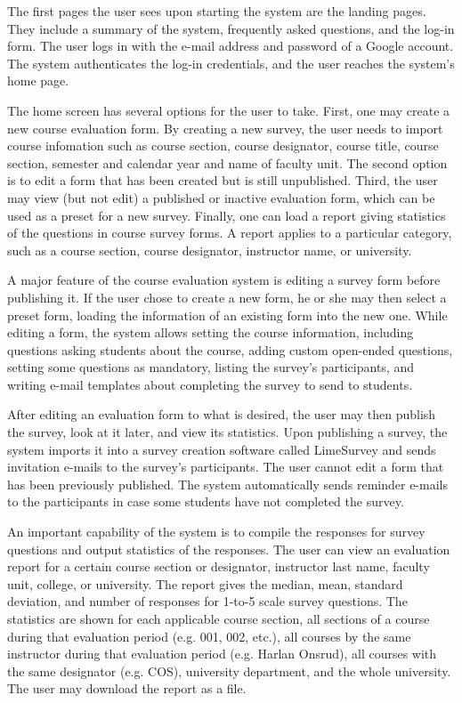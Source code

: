 \documentclass{article}
\begin{document}
The first pages the user sees upon starting the system are the landing pages. They include a summary of the system, frequently asked questions, and the log-in form. The user logs in with the e-mail address and password of a Google account. The system authenticates the log-in credentials, and the user reaches the system's home page.

The home screen has several options for the user to take. First, one may create a new course evaluation form. By creating a new survey, the user needs to import course infomation such as course section, course designator, course title, course section, semester and calendar year and name of faculty unit. The second option is to edit a form that has been created but is still unpublished. Third, the user may view (but not edit) a published or inactive evaluation form, which can be used as a preset for a new survey. Finally, one can load a report giving statistics of the questions in course survey forms. A report applies to a particular category, such as a course section, course designator, instructor name, or university.

A major feature of the course evaluation system is editing a survey form before publishing it. If the user chose to create a new form, he or she may then select a preset form, loading the information of an existing form into the new one. While editing a form, the system allows setting the course information, including questions asking students about the course, adding custom open-ended questions, setting some questions as mandatory, listing the survey's participants, and writing e-mail templates about completing the survey to send to students.

After editing an evaluation form to what is desired, the user may then publish the survey, look at it later, and view its statistics. Upon publishing a survey, the system imports it into a survey creation software called LimeSurvey and sends invitation e-mails to the survey's participants. The user cannot edit a form that has been previously published. The system automatically sends reminder e-mails to the participants in case some students have not completed the survey.

An important capability of the system is to compile the responses for survey questions and output statistics of the responses. The user can view an evaluation report for a certain course section or designator, instructor last name, faculty unit, college, or university. The report gives the median, mean, standard deviation, and number of responses for 1-to-5 scale survey questions. The statistics are shown for each applicable course section, all sections of a course during that evaluation period (e.g. 001, 002, etc.), all courses by the same instructor during that evaluation period (e.g. Harlan Onsrud), all courses with the same designator (e.g. COS), university department, and the whole university. The user may download the report as a file.
\end{document}
